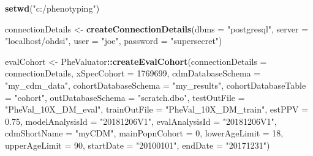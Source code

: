 \documentclass[]{article}
\newenvironment{Shaded}{\begin{snugshade}}{\end{snugshade}}
\newcommand{\DataTypeTok}[1]{\textcolor[rgb]{0.13,0.29,0.53}{#1}}
\newcommand{\DecValTok}[1]{\textcolor[rgb]{0.00,0.00,0.81}{#1}}
\newcommand{\FloatTok}[1]{\textcolor[rgb]{0.00,0.00,0.81}{#1}}
\newcommand{\KeywordTok}[1]{\textcolor[rgb]{0.13,0.29,0.53}{\textbf{#1}}}
\newcommand{\NormalTok}[1]{#1}
\newcommand{\OperatorTok}[1]{\textcolor[rgb]{0.81,0.36,0.00}{\textbf{#1}}}
\newcommand{\StringTok}[1]{\textcolor[rgb]{0.31,0.60,0.02}{#1}}
\begin{document}
\begin{Shaded}
\begin{Highlighting}[]
\KeywordTok{setwd}\NormalTok{(}\StringTok{"c:/phenotyping"}\NormalTok{)}

\NormalTok{connectionDetails <-}\StringTok{ }\KeywordTok{createConnectionDetails}\NormalTok{(}\DataTypeTok{dbms =} \StringTok{"postgresql"}\NormalTok{,}
                                              \DataTypeTok{server =} \StringTok{"localhost/ohdsi"}\NormalTok{,}
                                              \DataTypeTok{user =} \StringTok{"joe"}\NormalTok{,}
                                              \DataTypeTok{password =} \StringTok{"supersecret"}\NormalTok{)}

\NormalTok{evalCohort <-}\StringTok{ }\NormalTok{PheValuator}\OperatorTok{::}\KeywordTok{createEvalCohort}\NormalTok{(}\DataTypeTok{connectionDetails =}\NormalTok{ connectionDetails,}
                              \DataTypeTok{xSpecCohort =} \DecValTok{1769699}\NormalTok{, }
                              \DataTypeTok{cdmDatabaseSchema =} \StringTok{"my_cdm_data"}\NormalTok{,}
                              \DataTypeTok{cohortDatabaseSchema =} \StringTok{"my_results"}\NormalTok{,}
                              \DataTypeTok{cohortDatabaseTable =} \StringTok{"cohort"}\NormalTok{,}
                              \DataTypeTok{outDatabaseSchema =} \StringTok{"scratch.dbo"}\NormalTok{,}
                              \DataTypeTok{testOutFile =} \StringTok{"PheVal_10X_DM_eval"}\NormalTok{,}
                              \DataTypeTok{trainOutFile =} \StringTok{"PheVal_10X_DM_train"}\NormalTok{,}
                              \DataTypeTok{estPPV =} \FloatTok{0.75}\NormalTok{,}
                              \DataTypeTok{modelAnalysisId =} \StringTok{"20181206V1"}\NormalTok{, }
                              \DataTypeTok{evalAnalysisId =} \StringTok{"20181206V1"}\NormalTok{,}
                              \DataTypeTok{cdmShortName =} \StringTok{"myCDM"}\NormalTok{, }
                              \DataTypeTok{mainPopnCohort =} \DecValTok{0}\NormalTok{, }
                              \DataTypeTok{lowerAgeLimit =} \DecValTok{18}\NormalTok{, }
                              \DataTypeTok{upperAgeLimit =} \DecValTok{90}\NormalTok{,}
                              \DataTypeTok{startDate =} \StringTok{"20100101"}\NormalTok{,}
                              \DataTypeTok{endDate =} \StringTok{"20171231"}\NormalTok{)}
\end{Highlighting}
\end{Shaded}
\end{document}
